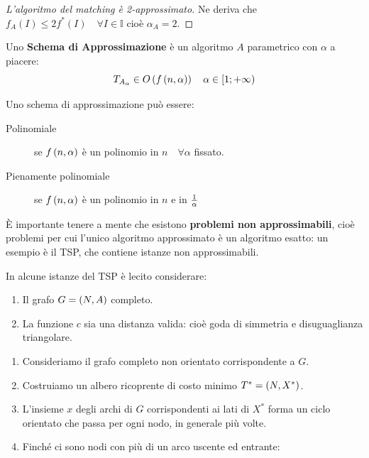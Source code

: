 \documentclass[\main/main.tex]{subfiles}
\begin{document}
\begin{multicols}{2}
\begin{proof}[L'algoritmo del matching è 2-approssimato]
    Ne deriva che \(f_A(I) \leq 2f^*(I) \quad \forall I \in \mathbb{I}\) cioè \(\alpha_A = 2\).
\end{proof}
\begin{definition}
Uno \textbf{Schema di Approssimazione} è un algoritmo \(A\) parametrico con \(\alpha\) a piacere:
\[
    T_{A_\alpha} \in O\left(f\left(n, \alpha\right)\right) \quad \alpha \in [1; + \infty)
\]

Uno schema di approssimazione può essere:
\begin{description}
\item[Polinomiale] se \(f\left(n,\alpha\right)\) è un polinomio in \(n \quad \forall \alpha\) fissato.
\item[Pienamente polinomiale] se \(f\left(n, \alpha\right)\) è un polinomio in \(n\) e in \(\frac{1}{\alpha}\)
\end{description}
\end{definition}
\begin{observation}
    È importante tenere a mente che esistono \textbf{problemi non approssimabili}, cioè problemi per cui l'unico algoritmo approssimato è un algoritmo esatto: un esempio è il TSP, che contiene istanze non approssimabili.
\end{observation}
\begin{observation}
    In alcune istanze del TSP è lecito considerare:
    \begin{enumerate}
        \item Il grafo \(G = \left(N, A\right)\) completo.
        \item La funzione \(c\) sia una distanza valida: cioè goda di simmetria e disuguaglianza triangolare.
    \end{enumerate}
\end{observation}
\begin{definition}
\begin{enumerate}
    \item Consideriamo il grafo completo non orientato corrispondente a \(G\).
    \item Costruiamo un albero ricoprente di costo minimo \(T^* = \left(N, X^*\right)\).
    \item L'insieme \(x\) degli archi di \(G\) corrispondenti ai lati di \(X^*\) forma un ciclo orientato che passa per ogni nodo, in generale più volte.
    \item Finché ci sono nodi con più di un arco uscente ed entrante:
    \begin{enumerate}

\end{enumerate}
\end{enumerate}
\end{definition}
\end{multicols}
\end{document}
